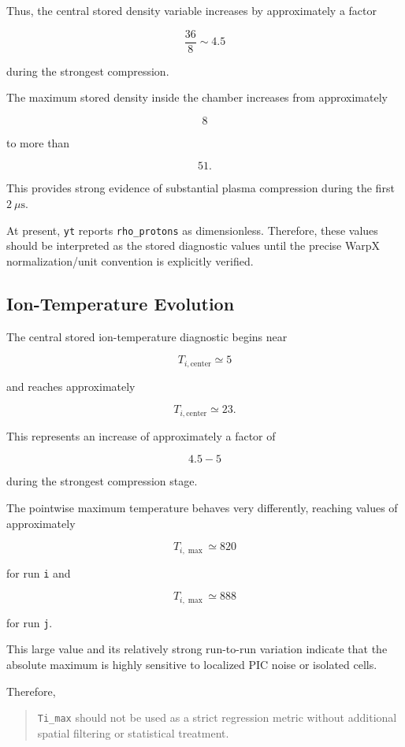 \documentclass[11pt,a4paper]{article}
\begin{document}
Thus, the central stored density variable increases by approximately a factor

\[
\frac{36}{8}\sim4.5
\]

during the strongest compression.

The maximum stored density inside the chamber increases from approximately

\[
8
\]

to more than

\[
51.
\]

This provides strong evidence of substantial plasma compression during the
first \(2~\mu\mathrm{s}\).

At present, \texttt{yt} reports \texttt{rho\_protons} as dimensionless.
Therefore, these values should be interpreted as the stored diagnostic values
until the precise WarpX normalization/unit convention is explicitly verified.

\subsection{Ion-Temperature Evolution}

The central stored ion-temperature diagnostic begins near

\[
T_{i,\mathrm{center}}\simeq 5
\]

and reaches approximately

\[
T_{i,\mathrm{center}}\simeq23.
\]

This represents an increase of approximately a factor of

\[
4.5-5
\]

during the strongest compression stage.

The pointwise maximum temperature behaves very differently, reaching values
of approximately

\[
T_{i,\max}\simeq820
\]

for run \texttt{i} and

\[
T_{i,\max}\simeq888
\]

for run \texttt{j}.

This large value and its relatively strong run-to-run variation indicate that
the absolute maximum is highly sensitive to localized PIC noise or isolated
cells.

Therefore,

\begin{quote}
\texttt{Ti\_max} should not be used as a strict regression metric without
additional spatial filtering or statistical treatment.
\end{quote}
\end{document}
